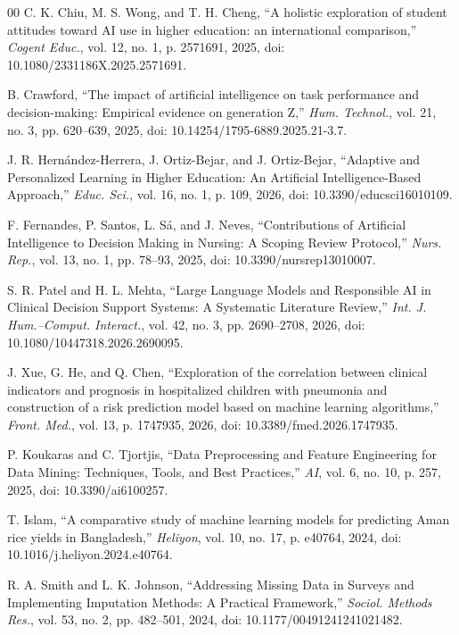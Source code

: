 \documentclass{ieeeaccess}
\begin{document}
\begin{thebibliography}{00}
 C. K. Chiu, M. S. Wong, and T. H. Cheng, ``A holistic exploration of student attitudes toward AI use in higher education: an international comparison,'' \emph{Cogent Educ.}, vol. 12, no. 1, p. 2571691, 2025, doi: 10.1080/2331186X.2025.2571691.

 B. Crawford, ``The impact of artificial intelligence on task performance and decision-making: Empirical evidence on generation Z,'' \emph{Hum. Technol.}, vol. 21, no. 3, pp. 620--639, 2025, doi: 10.14254/1795-6889.2025.21-3.7.

 J. R. Hern\'{a}ndez-Herrera, J. Ortiz-Bejar, and J. Ortiz-Bejar, ``Adaptive and Personalized Learning in Higher Education: An Artificial Intelligence-Based Approach,'' \emph{Educ. Sci.}, vol. 16, no. 1, p. 109, 2026, doi: 10.3390/educsci16010109.

 F. Fernandes, P. Santos, L. S\'{a}, and J. Neves, ``Contributions of Artificial Intelligence to Decision Making in Nursing: A Scoping Review Protocol,'' \emph{Nurs. Rep.}, vol. 13, no. 1, pp. 78--93, 2025, doi: 10.3390/nursrep13010007.

 S. R. Patel and H. L. Mehta, ``Large Language Models and Responsible AI in Clinical Decision Support Systems: A Systematic Literature Review,'' \emph{Int. J. Hum.--Comput. Interact.}, vol. 42, no. 3, pp. 2690--2708, 2026, doi: 10.1080/10447318.2026.2690095.

 J. Xue, G. He, and Q. Chen, ``Exploration of the correlation between clinical indicators and prognosis in hospitalized children with pneumonia and construction of a risk prediction model based on machine learning algorithms,'' \emph{Front. Med.}, vol. 13, p. 1747935, 2026, doi: 10.3389/fmed.2026.1747935.

 P. Koukaras and C. Tjortjis, ``Data Preprocessing and Feature Engineering for Data Mining: Techniques, Tools, and Best Practices,'' \emph{AI}, vol. 6, no. 10, p. 257, 2025, doi: 10.3390/ai6100257.

 T. Islam, ``A comparative study of machine learning models for predicting Aman rice yields in Bangladesh,'' \emph{Heliyon}, vol. 10, no. 17, p. e40764, 2024, doi: 10.1016/j.heliyon.2024.e40764.

 R. A. Smith and L. K. Johnson, ``Addressing Missing Data in Surveys and Implementing Imputation Methods: A Practical Framework,'' \emph{Sociol. Methods Res.}, vol. 53, no. 2, pp. 482--501, 2024, doi: 10.1177/00491241241021482.


\end{thebibliography}
\end{document}
